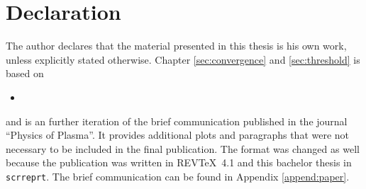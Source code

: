 \chapter*{Declaration}
\label{chap:declaration}

The author declares that the material presented in this thesis is his own work, unless explicitly stated otherwise. Chapter \ref{sec:convergence} and \ref{sec:threshold} is based on
\bigskip
\begin{itemize}
    \item [] 
\end{itemize}
\bigskip
and is an further iteration of the brief communication published in the journal \enquote{Physics of Plasma}. It provides additional plots and paragraphs that were not necessary to be included in the final publication. The format was changed as well because the publication was written in REV\TeX~4.1 and this bachelor thesis in \texttt{scrreprt}. The brief communication can be found in Appendix \ref{append:paper}.